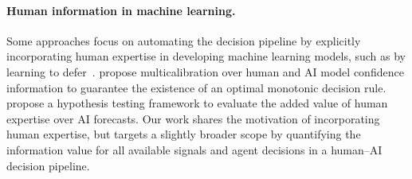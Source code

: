 \mvspace{-3mm}
\paragraph{Human information in machine learning.}

Some approaches focus on automating the decision pipeline by explicitly incorporating human expertise in developing machine learning models, such as by learning to defer~\citep{mozannar2024show, madras2018predict, raghu2019algorithmic, keswani2022designing, keswani2021towards, okati2021differentiable}.
\citet{corvelo2023human} propose multicalibration over human and AI model confidence information to guarantee the existence of an optimal monotonic decision rule.
\citet{alur2023auditing} propose a hypothesis testing framework to evaluate the added value of human expertise over AI forecasts.
Our work shares the motivation of incorporating human expertise, but targets a slightly broader scope by quantifying the information value for all available signals and agent decisions in a human–AI decision pipeline.